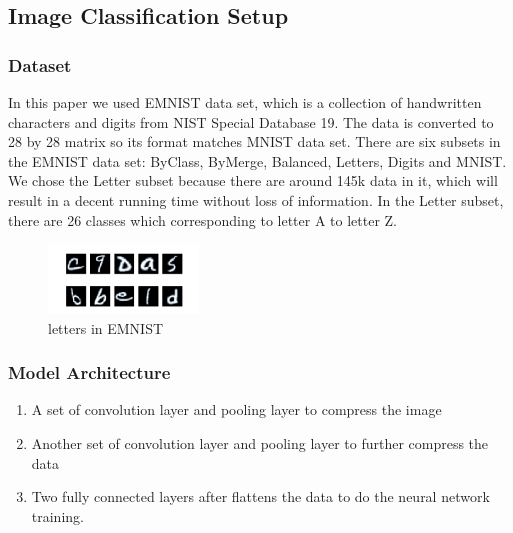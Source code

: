 \subsection{Image Classification Setup}

\subsubsection{Dataset}

In this paper we used EMNIST \cite{emnist} data set, which is a collection of handwritten characters and digits from NIST Special Database 19. The data is converted to 28 by 28 matrix so its format matches MNIST data set. There are six subsets in the EMNIST data set: ByClass, ByMerge, Balanced, Letters, Digits and MNIST. We chose the Letter subset because there are around 145k data in it, which will result in a decent running time without loss of information. In the Letter subset, there are 26 classes which corresponding to letter A to letter Z.
\begin{figure}[htp]
    \centering
    \includegraphics[width=4cm]{img/EMNIST.png}
    \caption{letters in EMNIST}
    \label{fig:EMNIST}
\end{figure}


\subsubsection{Model Architecture}
\begin{enumerate}[start=1,label={\bfseries\arabic*:}]
    \item A set of convolution layer and pooling layer to compress the image
    \item Another set of convolution layer and pooling layer to further compress the data
    \item Two fully connected layers after flattens the data to do the neural network training.
    \end{enumerate}


